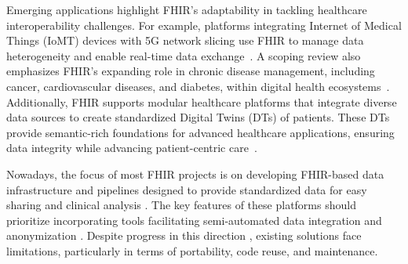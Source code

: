 Emerging applications highlight FHIR's adaptability in tackling healthcare interoperability challenges. For example, platforms integrating Internet of Medical Things (IoMT) devices with 5G network slicing use FHIR to manage data heterogeneity and enable real-time data exchange~\cite{mavrogiorgou_internet_2019}. A scoping review also emphasizes FHIR's expanding role in chronic disease management, including cancer, cardiovascular diseases, and diabetes, within digital health ecosystems~\cite{gazzarata_hl7_2024}. Additionally, FHIR supports modular healthcare platforms that integrate diverse data sources to create standardized Digital Twins (DTs) of patients. These DTs provide semantic-rich foundations for advanced healthcare applications, ensuring data integrity while advancing patient-centric care~\cite{10.3389/fdgth.2023.1322428_carbonaro_connected}.
%
%

Nowadays, the focus of most FHIR projects is on developing FHIR-based data infrastructure and pipelines designed to provide standardized data for easy sharing and clinical analysis \cite{duda_hl7_2022}. The key features of these platforms should prioritize incorporating tools facilitating semi-automated data integration and anonymization \cite{gehrmann_what_2023}. Despite progress in this direction \cite{williams2023standardized,xiao_fhir-ontop-omop_2022,kiourtis_structurally_2019,lichtner_representation_2023}, existing solutions face limitations, particularly in terms of portability, code reuse, and maintenance.  

